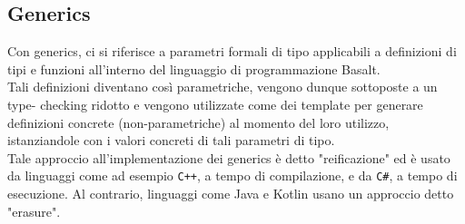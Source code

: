 \subsection{Generics}
Con generics, ci si riferisce a parametri formali di tipo applicabili a definizioni di tipi e
funzioni all’interno del linguaggio di programmazione Basalt. \\

Tali definizioni diventano così parametriche, vengono dunque sottoposte a un type-
checking ridotto e vengono utilizzate come dei template per generare definizioni concrete
(non-parametriche) al momento del loro utilizzo, istanziandole con i valori concreti di tali
parametri di tipo. \\

Tale approccio all’implementazione dei generics è detto "reificazione" ed è usato da
linguaggi come ad esempio \texttt{C++}, a tempo di compilazione, e da \texttt{C\#}, a tempo di esecuzione. Al 
contrario, linguaggi come Java e Kotlin usano un approccio detto "erasure".





